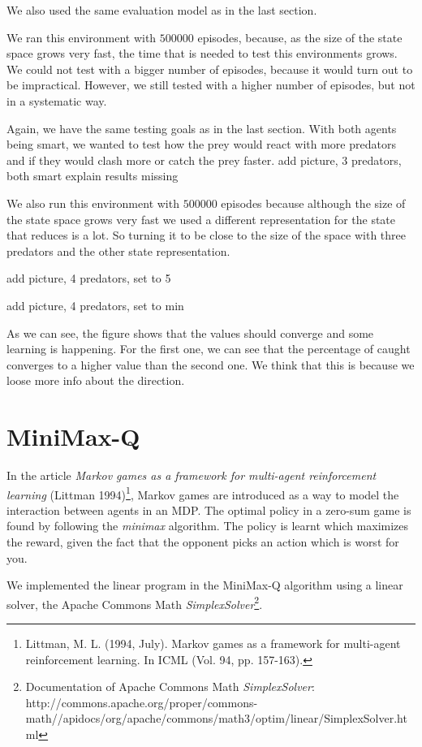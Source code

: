 \documentclass{article}
\begin{document}
We also used the same evaluation model as in the last section.

We ran this environment with $500000$ episodes, because, as the size of the state
space grows very fast, the time that is needed to test this environments grows.
We could not test with a bigger number of episodes, because it would turn out to
be impractical. However, we still tested with a higher number of episodes, but not
in a systematic way.

Again, we have the same testing goals as in the last section.  With both agents being smart, we wanted to test how the prey would react with more predators and if they would
clash more or catch the prey faster.
\error add picture, 3 predators, both smart
\error explain results missing

We also run this environment with $500000$ episodes because although the size of
the state space grows very fast we used a different representation for the
state that reduces is a lot. So turning it to be close to the size of the space
with three predators and the other state representation.

\error add picture, 4 predators, set to 5

\error add picture, 4 predators, set to min

As we can see, the figure shows that the values should converge and some
learning is happening. For the first one, we can see that the percentage of
caught converges to a higher value than the second one. We think that this is
because we loose more info about the direction. 
\section{MiniMax-Q}
In the article \emph{Markov games as a framework for multi-agent reinforcement learning} (Littman 1994)\footnote{Littman, M. L. (1994, July). Markov games as a framework for multi-agent reinforcement learning. In ICML (Vol. 94, pp. 157-163).}, Markov games are introduced as a way to model the interaction between agents in an MDP. The optimal policy in a zero-sum game is found by following the \emph{minimax} algorithm. The policy is learnt which maximizes the reward, given the fact that the opponent picks an action which is worst for you.

We implemented the linear program in the MiniMax-Q algorithm using a linear solver, the Apache Commons Math \emph{SimplexSolver}\footnote{Documentation of Apache Commons Math \emph{SimplexSolver}: http://commons.apache.org/proper/commons-math//apidocs/org/apache/commons/math3/optim/linear/SimplexSolver.html}.
\end{document}
